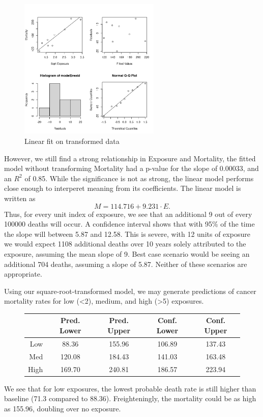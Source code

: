 \documentclass[]{article}
\begin{document}
\begin{figure}[htpb]
	\centering
	\includegraphics[width=0.6\textwidth]{"../sqrtExposreXmortality.png"}
	\caption{Linear fit on transformed data}
	\label{fig:sqdat}
\end{figure}
However, we still find a strong relationship in Exposure and Mortality, the fitted model without transforming Mortality had a p-value for the slope of 0.00033, and an \(R^2\) of 0.85. While the significance is not as strong, the linear model performs close enough to interperet meaning from its coefficients. The linear model is written as \begin{equation}M = 114.716 + 9.231 \cdot E.\end{equation} Thus, for every unit index of exposure, we see that an additional 9 out of every 100000 deaths will occur. A confidence interval shows that with 95\% of the time the slope will between 5.87 and 12.58. This is severe, with 12 units of exposure we would expect 1108 additional deaths over 10 years solely attributed to the exposure, assuming the mean slope of 9. Best case scenario would be seeing an additional 704 deaths, assuming a slope of 5.87. Neither of these scenarios are appropriate.

Using our square-root-transformed model, we may generate predictions of cancer mortality rates for low (<2), medium, and high (>5) exposures.

\begin{figure}[htpb]
	\centering
\begin{tabular}{r|c|c|c|c}
  & Pred. Lower & Pred. Upper & Conf. Lower & Conf. Upper \\
 \hline
 Low & 88.36 & 155.96 & 106.89 & 137.43 \\
 Med & 120.08 & 184.43 & 141.03 & 163.48  \\
 High & 169.70 & 240.81 & 186.57 & 223.94 \\
\end{tabular}
\end{figure}
We see that for low exposures, the lowest probable death rate is still higher than baseline (71.3 compared to 88.36). Freighteningly, the mortality could be as high as 155.96, doubling over no exposure.
\end{document}
